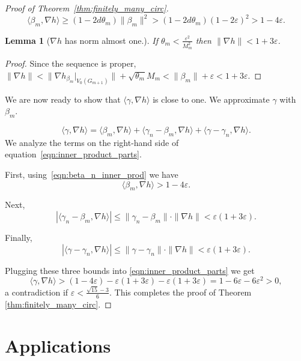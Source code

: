 \documentclass[10pt]{article}
\theoremstyle{plain}
\newtheorem{lemma}{Lemma}[section]
\theoremstyle{remark}
\newcommand{\1}{\mathbbm{1}}
\numberwithin{equation}{section}
\begin{document}
\begin{proof}[Proof of Theorem~\ref{thm:finitely_many_circ}]
\begin{equation}
\label{eqn:beta_n_inner_prod} \langle \beta_m, \nabla h \rangle \geq (1-2d\theta_m) \|\beta_m\|^2 > (1-2d\theta_m)(1-2\varepsilon)^2 > 1-4\varepsilon.
\end{equation} 

\begin{lemma}[$\nabla h$ has norm almost one.] \label{lemma:nabla_h_norm}
If $\theta_m<\frac{\varepsilon^2}{M_m^2}$ then $\|\nabla h\| < 1+3\varepsilon$.
\end{lemma}
\begin{proof} Since the sequence 
is proper, $\|\nabla h\| < \|\nabla h_{\beta_m}|_{V_0(G_{m+1})}\|+\sqrt{\theta_m} M_m < \|\beta_m\|+\varepsilon < 1+3\varepsilon.$
\end{proof}

We are now ready to show that $\langle\gamma, \nabla h\rangle$ is close to one. We approximate $\gamma$ with $\beta_m$.

\begin{equation} \label{eqn:inner_product_parts}
    \langle \gamma, \nabla h \rangle = \langle \beta_m, \nabla h \rangle + \langle \gamma_n - \beta_m, \nabla h \rangle + \langle \gamma - \gamma_n, \nabla h \rangle.
\end{equation}
We analyze the terms on the right-hand side of equation~\ref{eqn:inner_product_parts}. 

First, using~\ref{eqn:beta_n_inner_prod} we have
\[\langle \beta_m, \nabla h \rangle > 1- 4\varepsilon.\]

Next, \[|\langle \gamma_n - \beta_m, \nabla h \rangle| \leq  \|\gamma_n-\beta_m \| \cdot \|\nabla h\| < \varepsilon (1+3\varepsilon).\]

Finally, 
\[|\langle \gamma - \gamma_n, \nabla h \rangle| \leq \|\gamma-\gamma_n \| \cdot \|\nabla h\| < \varepsilon(1+3\varepsilon).\]

Plugging these three bounds into \ref{eqn:inner_product_parts} we get
\[\langle \gamma, \nabla h \rangle > (1-4\varepsilon)- \varepsilon(1+3\varepsilon)-\varepsilon(1+3\varepsilon)=1-6\varepsilon -6\varepsilon^2>0,\] a contradiction if 
$\varepsilon < \frac{\sqrt{15}-3}{6}$. 
This completes the proof of Theorem \ref{thm:finitely_many_circ}.
\end{proof}

\section{Applications} \label{sec:applications}
\end{document}
